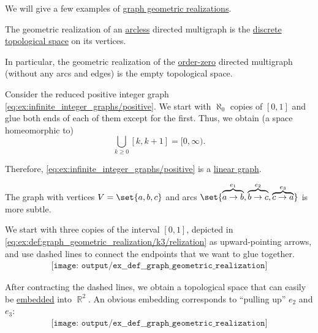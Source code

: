 \begin{example}\label{ex:def:graph_geometric_realization}
  We will give a few examples of \hyperref[def:graph_geometric_realization]{graph geometric realizations}.

  \begin{thmenum}
     The geometric realization of an \hyperref[rem:trivial_graph]{arcless} directed multigraph is the \hyperref[def:discrete_topology]{discrete topological space} on its vertices.

    In particular, the geometric realization of the \hyperref[rem:trivial_graph]{order-zero} directed multigraph (without any arcs and edges) is the empty topological space.

     Consider the reduced positive integer graph \eqref{eq:ex:infinite_integer_graphs/positive}. We start with \( \aleph_0 \) copies of \( [0, 1] \) and glue both ends of each of them except for the first. Thus, we obtain (a space homeomorphic to)
    \begin{equation*}
      \bigcup_{k \geq 0} [k, k + 1] = [0, \infty).
    \end{equation*}

    Therefore, \eqref{eq:ex:infinite_integer_graphs/positive} is a \hyperref[def:linear_graph]{linear graph}.

     The graph with vertices \( V = \set{ a, b, c } \) and arcs \( \set{ \overbrace{a \to b}^{e_1}, \overbrace{b \to c}^{e_2}, \overbrace{c \to a}^{e_3} } \) is more subtle.

    We start with three copies of the interval \( [0, 1] \), depicted in \eqref{eq:ex:def:graph_geometric_realization/k3/relization} as upward-pointing arrows, and use dashed lines to connect the endpoints that we want to glue together.
    \begin{equation}\label{eq:ex:def:graph_geometric_realization/k3/relization}
      \begin{aligned}
        \texttt{[image: output/ex\_\_def\_\_graph\_geometric\_realization]}
      \end{aligned}
    \end{equation}

    After contracting the dashed lines, we obtain a topological space that can easily be \hyperref[def:graph_geometric_realization/embedding]{embedded} into \( \BbbR^2 \). An obvious embedding corresponds to \enquote{pulling up} \( e_2 \) and \( e_3 \):
    \begin{equation}\label{eq:ex:def:graph_geometric_realization/k3/embedding}
      \begin{aligned}
        \texttt{[image: output/ex\_\_def\_\_graph\_geometric\_realization]}
      \end{aligned}
    \end{equation}


\end{thmenum}
\end{example}
